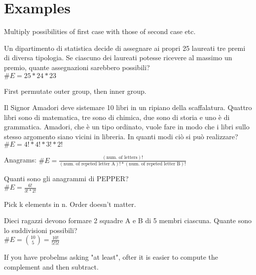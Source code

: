 \section{Examples}
Multiply possibilities of first case with those of second case etc.
\begin{example}
Un dipartimento di statistica decide di assegnare ai propri 25 laureati tre premi di diversa tipologia. Se ciascuno dei laureati potesse ricevere al massimo un premio, quante assegnazioni sarebbero possibili?\\
$\#E = 25*24*23$
\end{example}
\medskip
First permutate outer group, then inner group.
\begin{example}
Il Signor Amadori deve sistemare 10 libri in un ripiano della scaffalatura. Quattro libri sono di matematica, tre sono di chimica, due sono di storia e uno è di grammatica. Amadori, che è un tipo ordinato, vuole fare in modo che i libri sullo stesso argomento siano vicini in libreria. In quanti modi ciò si può realizzare?\\
$\#E = 4!*4!*3!*2!$
\end{example}
\medskip
Anagrams: $\#E = \frac{(\text{num. of letters})!}{(\text{num. of repeted letter A})!*(\text{num. of repeted letter B})!}$
\begin{example}
Quanti sono gli anagrammi di PEPPER?\\
$\#E = \frac{6!}{3!*2!}$
\end{example}
\medskip
Pick k elements in n. Order doesn't matter.
\begin{example}
Dieci ragazzi devono formare 2 squadre A e B di 5 membri ciascuna. Quante sono lo suddivisioni possibili?\\
$\#E = \binom{10}{5}=\frac{10!}{5!5!}$
\end{example}
If you have probelms asking "at least", ofter it is easier to compute the complement and then subtract.
